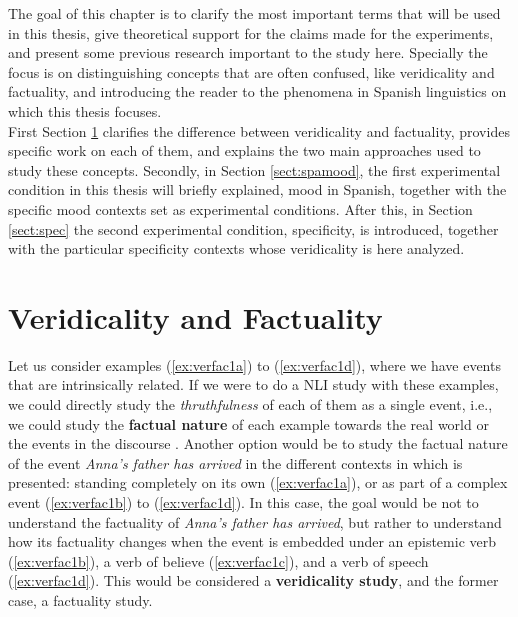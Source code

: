 \label{chap:back}
The goal of this chapter is to clarify the most important terms that will be used in this thesis, give theoretical support for the claims made for the experiments, and present some previous research important to the study here. Specially the focus is on distinguishing concepts that are often confused, like veridicality and factuality, and introducing the reader to the phenomena in Spanish linguistics on which this thesis focuses.\\

First Section \ref{sect:verandfact} clarifies the difference between veridicality and factuality, provides specific work on each of them, and explains the two main approaches used to study these concepts. Secondly, in Section \ref{sect:spamood}, the first experimental condition in this thesis will briefly explained, mood in Spanish, together with the specific mood contexts set as experimental conditions. After this, in Section \ref{sect:spec} the second experimental condition, specificity, is introduced, together with the particular specificity contexts whose veridicality is here analyzed.\\

\section{Veridicality and Factuality}
\label{sect:verandfact}

Let us consider examples (\ref{ex:verfac1a}) to (\ref{ex:verfac1d}), where we have events that are intrinsically related. If we were to do a NLI study with these examples, we could directly study the \textit{thruthfulness} of each of them as a single event, i.e., we could study the \textbf{factual nature} of each example towards the real world or the events in the discourse \citep{sauri2009factbank}. Another option would be to study the factual nature of the event \textit{Anna's father has arrived} in the different contexts in which is presented: standing completely on its own (\ref{ex:verfac1a}), or as part of a complex event (\ref{ex:verfac1b}) to (\ref{ex:verfac1d}). In this case, the goal would be not to understand the factuality of \textit{Anna's father has arrived}, but rather to understand how its factuality changes when the event is embedded under an epistemic verb (\ref{ex:verfac1b}), a verb of believe (\ref{ex:verfac1c}), and a verb of speech (\ref{ex:verfac1d}). This would be considered a \textbf{veridicality study}, and the former case, a factuality study.\\

